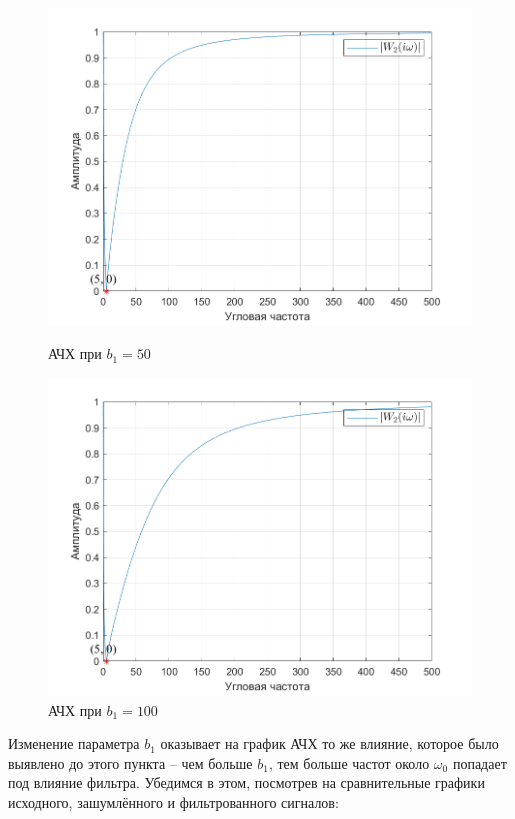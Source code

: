 \documentclass[a4paper]{article}
\begin{document}
\begin{figure}[H]
    \begin{minipage}{0.5\textwidth}
        \centering
        \includegraphics[width=\linewidth]{ex1_2/a1=0_a2=25_b1=50_b2=25_d=5/h1.png}
        \caption{АЧХ при $b_1=50$}
    \end{minipage}
    \begin{minipage}{0.5\textwidth}
        \centering
        \includegraphics[width=\linewidth]{ex1_2/a1=0_a2=25_b1=100_b2=25_d=5/h1.png}
        \caption{АЧХ при $b_1=100$}
    \end{minipage}
\end{figure}

Изменение параметра $b_1$ оказывает на график АЧХ то же влияние, которое было выявлено до этого пункта -- чем больше $b_1$, тем больше частот около $\omega_0$ попадает под влияние фильтра. Убедимся в этом, посмотрев на сравнительные графики исходного, зашумлённого и фильтрованного сигналов:
\end{document}
